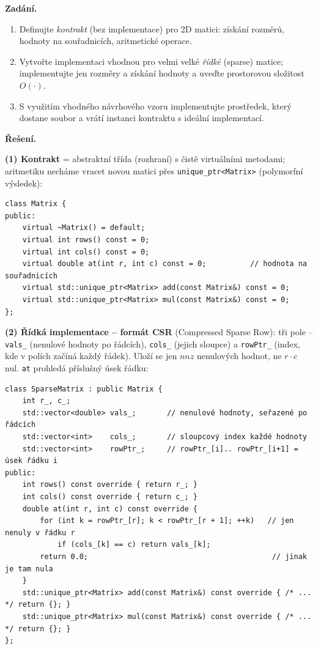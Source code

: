 \documentclass[11pt,a4paper]{article}
\newcommand{\cd}{\lstinline[style=cpp]}
\begin{document}
\begin{priklad}
\par

\textbf{Zadání.}\par
\begin{enumerate}
  \item Definujte \emph{kontrakt} (bez implementace) pro 2D matici: získání rozměrů, hodnoty na souřadnicích, aritmetické operace.
  \item Vytvořte implementaci vhodnou pro velmi velké \emph{řídké} (sparse) matice; implementujte jen rozměry a získání hodnoty a uveďte prostorovou složitost $O(\cdot)$.
  \item S využitím vhodného návrhového vzoru implementujte prostředek, který dostane soubor a vrátí instanci kontraktu s ideální implementací.
\end{enumerate}

\medskip
\textbf{Řešení.}\par
\textbf{(1) Kontrakt} = abstraktní třída (rozhraní) s čistě virtuálními metodami; aritmetiku necháme vracet novou matici přes \cd{unique_ptr<Matrix>} (polymorfní výsledek):

\begin{lstlisting}[style=cpp]
class Matrix {
public:
    virtual ~Matrix() = default;
    virtual int rows() const = 0;
    virtual int cols() const = 0;
    virtual double at(int r, int c) const = 0;          // hodnota na souřadnicích
    virtual std::unique_ptr<Matrix> add(const Matrix&) const = 0;
    virtual std::unique_ptr<Matrix> mul(const Matrix&) const = 0;
};
\end{lstlisting}

\textbf{(2) Řídká implementace -- formát CSR} (Compressed Sparse Row): tři pole -- \texttt{vals\_} (nenulové hodnoty po řádcích), \texttt{cols\_} (jejich sloupce) a \texttt{rowPtr\_} (index, kde v polích začíná každý řádek). Uloží se jen $\mathit{nnz}$ nenulových hodnot, ne $r\cdot c$ nul. \texttt{at} prohledá příslušný úsek řádku:

\begin{lstlisting}[style=cpp]
class SparseMatrix : public Matrix {
    int r_, c_;
    std::vector<double> vals_;       // nenulové hodnoty, seřazené po řádcích
    std::vector<int>    cols_;       // sloupcový index každé hodnoty
    std::vector<int>    rowPtr_;     // rowPtr_[i].. rowPtr_[i+1] = úsek řádku i
public:
    int rows() const override { return r_; }
    int cols() const override { return c_; }
    double at(int r, int c) const override {
        for (int k = rowPtr_[r]; k < rowPtr_[r + 1]; ++k)   // jen nenuly v řádku r
            if (cols_[k] == c) return vals_[k];
        return 0.0;                                          // jinak je tam nula
    }
    std::unique_ptr<Matrix> add(const Matrix&) const override { /* ... */ return {}; }
    std::unique_ptr<Matrix> mul(const Matrix&) const override { /* ... */ return {}; }
};
\end{lstlisting}


\end{priklad}
\end{document}
